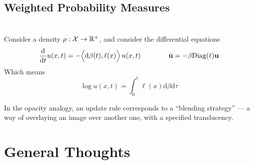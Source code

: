 \documentclass{article}
\begin{document}
\subsection{Weighted Probability Measures}

\section{}
Consider a density $\rho : \mathcal X \to \mathbb R^+$, and consider the differential equations
\[
    \frac{\mathrm d}{\mathrm d t} u(x,t)
    = - \Big\langle\mathrm d\beta(t), \ell(x) \Big\rangle
        \,
        {u(x,t)}
    \qquad\qquad%
    \dot {\mat u} = - \beta \mathrm{Diag}(\ell) \mat u
\]
Which means
\[
        \log u (x,t)
    = \int_{0}^{t}  \ell(x) \mathrm d \beta \mathrm d \tau
\]














In the opacity analogy, an update rule corresponds to a ``blending strategy'' --- a way of overlaying an image over another one, with a specified translucency.


\newpage
\printbibliography


\appendix
\section{General Thoughts}
\end{document}
